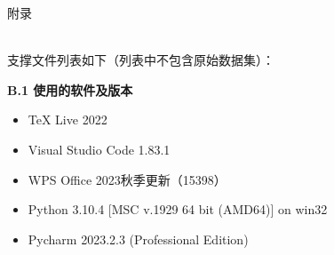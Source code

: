 \documentclass{MathorCupmodeling}
\begin{document}

	\begin{center}
		\heiti{} 附\hspace{2pc}录
	\end{center}

	~\\

	支撑文件列表如下（列表中不包含原始数据集）：
	\begin{table}[H]
		\centering
	\end{table}
  
\newpage

	\textbf{B.1 使用的软件及版本}
	\begin{itemize}
		\item TeX Live 2022
		\item Visual Studio Code 1.83.1
		\item WPS Office 2023秋季更新（15398）
		\item Python 3.10.4 [MSC v.1929 64 bit (AMD64)] on win32
		\item Pycharm 2023.2.3 (Professional Edition)
	\end{itemize}
	
\end{document}
